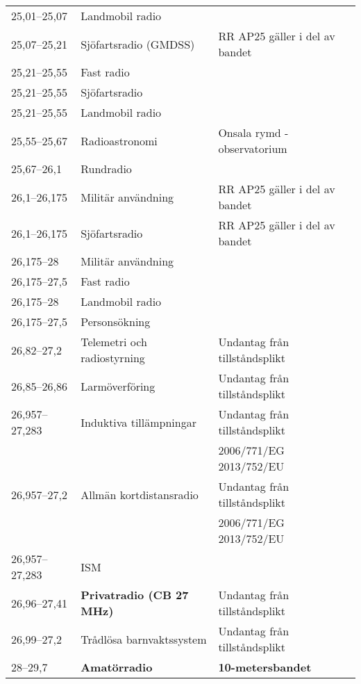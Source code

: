 \begin{landscape}
\begin{longtable}{lll}
25,01--25,07      & Landmobil radio                  &                                 \\
25,07--25,21      & Sjöfartsradio (GMDSS)            & RR AP25 gäller i del av bandet  \\
25,21--25,55      & Fast radio                       &                                 \\
25,21--25,55      & Sjöfartsradio                    &                                 \\
25,21--25,55      & Landmobil radio                  &                                 \\
25,55--25,67      & Radioastronomi                   & Onsala rymd - observatorium     \\
25,67--26,1       & Rundradio                        &                                 \\
26,1--26,175      & Militär användning               & RR AP25 gäller i del av bandet  \\
26,1--26,175      & Sjöfartsradio                    & RR AP25 gäller i del av bandet  \\
26,175--28        & Militär användning               &                                 \\
26,175--27,5      & Fast radio                       &                                 \\
26,175--28        & Landmobil radio                  &                                 \\
26,175--27,5      & Personsökning                    &                                 \\
26,82--27,2       & Telemetri och radiostyrning      & Undantag från tillståndsplikt   \\
26,85--26,86      & Larmöverföring                   & Undantag från tillståndsplikt   \\
26,957--27,283    & Induktiva tillämpningar          & Undantag från tillståndsplikt   \\
                  &                                  & 2006/771/EG 2013/752/EU         \\
26,957--27,2      & Allmän kortdistansradio          & Undantag från tillståndsplikt   \\
                  &                                  & 2006/771/EG 2013/752/EU         \\
26,957--27,283    & ISM                              &                                 \\
26,96--27,41      & \textbf{Privatradio (CB 27 MHz)} & Undantag från tillståndsplikt   \\
26,99--27,2       & Trådlösa barnvaktssystem         & Undantag från tillståndsplikt   \\
28--29,7          & \textbf{Amatörradio}             & \textbf{10-metersbandet}        \\
\end{longtable}
\normalsize
\end{landscape}
